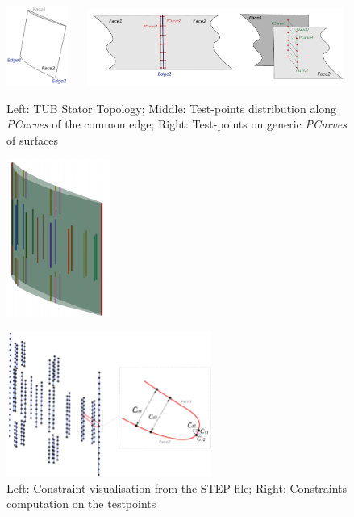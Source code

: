\documentclass[9pt,academicons]{article}
\begin{document}
\begin{figure}
\begin{center}
\includegraphics[width = 0.18\textwidth]{img/topo.pdf}
~~
\includegraphics[width = 0.75\textwidth]{img/faceTP2.pdf}
\caption{Left: TUB Stator Topology; Middle: Test-points distribution along \textit{PCurves} of the common edge; Right: Test-points on generic \textit{PCurves} of surfaces}
\label{fig:pcurves}
\end{center}
\end{figure}
\begin{figure}
\begin{center}
\includegraphics[width = 0.3\textwidth]{img/NewCylindersC1.pdf}
~~

\includegraphics[width = 0.6\textwidth]{img/const3.pdf}
\caption{Left: Constraint visualisation from the STEP file; Right: Constraints computation on the testpoints}
\label{fig:constraints}
\end{center}
\end{figure}
\end{document}
